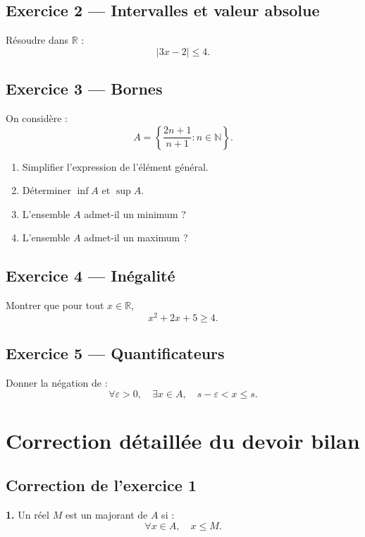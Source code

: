 \documentclass[11pt,a4paper]{article}
\newcommand{\N}{\mathbb N}
\newcommand{\R}{\mathbb R}
\newcommand{\abs}[1]{\left|#1\right|}
\begin{document}
\subsection*{Exercice 2 — Intervalles et valeur absolue}

Résoudre dans \(\R\) :
\[
\abs{3x-2}\leq 4.
\]

\subsection*{Exercice 3 — Bornes}

On considère :
\[
A=\left\{\frac{2n+1}{n+1}: n\in\N\right\}.
\]

\begin{enumerate}
    \item Simplifier l'expression de l'élément général.
    \item Déterminer \(\inf A\) et \(\sup A\).
    \item L'ensemble \(A\) admet-il un minimum ?
    \item L'ensemble \(A\) admet-il un maximum ?
\end{enumerate}

\subsection*{Exercice 4 — Inégalité}

Montrer que pour tout \(x\in\R\),
\[
x^2+2x+5\geq4.
\]

\subsection*{Exercice 5 — Quantificateurs}

Donner la négation de :
\[
\forall \varepsilon>0,\quad \exists x\in A,\quad s-\varepsilon<x\leq s.
\]

\newpage

\section{Correction détaillée du devoir bilan}

\subsection*{Correction de l'exercice 1}

\textbf{1.}  
Un réel \(M\) est un majorant de \(A\) si :
\[
\forall x\in A,\quad x\leq M.
\]
\end{document}
